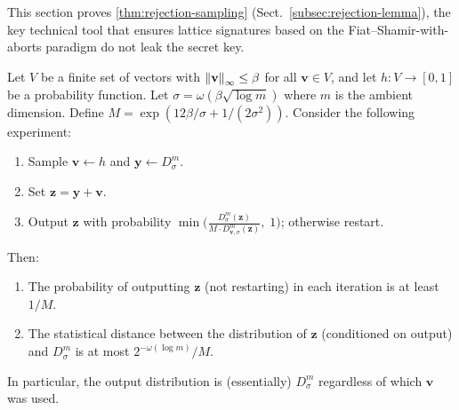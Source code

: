 This section proves \cref{thm:rejection-sampling}
(Sect.~\ref{subsec:rejection-lemma}), the key technical tool
that ensures lattice signatures based on the Fiat--Shamir-with-aborts
paradigm do not leak the secret key.

\begin{lemma}
\label{lem:rejection-sampling-app}
Let $V$ be a finite set of vectors with
$\left\lVert \mathbf{v} \right\rVert_\infty \leq \beta$ for all
$\mathbf{v} \in V$, and let $h : V \to [0,1]$ be a
probability function.  Let $\sigma = \omega(\beta\sqrt{\log m})$
where $m$ is the ambient dimension.  Define
$M = \exp(12\beta/\sigma + 1/(2\sigma^2))$.  Consider the
following experiment:
\begin{enumerate}
\item Sample $\mathbf{v} \leftarrow h$ and
  $\mathbf{y} \leftarrow D_\sigma^m$.
\item Set $\mathbf{z} = \mathbf{y} + \mathbf{v}$.
\item Output $\mathbf{z}$ with probability
  $\min\!\bigl(\frac{D_\sigma^m(\mathbf{z})}{M \cdot
  D_{\mathbf{v},\sigma}^m(\mathbf{z})},\; 1\bigr)$;
  otherwise restart.
\end{enumerate}
Then:
\begin{enumerate}
\item[\textup{(a)}] The probability of outputting $\mathbf{z}$
  (not restarting) in each iteration is at least $1/M$.
\item[\textup{(b)}] The statistical distance between the
  distribution of $\mathbf{z}$ (conditioned on output) and
  $D_\sigma^m$ is at most $2^{-\omega(\log m)} / M$.
\end{enumerate}
In particular, the output distribution is (essentially)
$D_\sigma^m$ regardless of which $\mathbf{v}$ was used.
\end{lemma}

